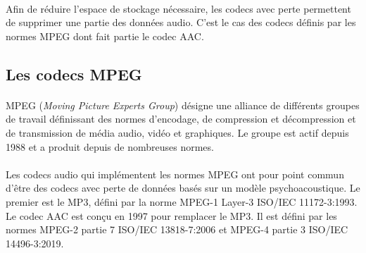 \documentclass{article}
\begin{document}
    \paragraph{}
    Afin de réduire l'espace de stockage nécessaire, les codecs avec perte permettent de supprimer une partie des données audio. C'est le cas des codecs définis par les normes MPEG dont fait partie le codec AAC.

    \subsection{Les codecs MPEG}
    \paragraph{}
    MPEG (\emph{Moving Picture Experts Group}) désigne une alliance de différents groupes de travail définissant des normes d'encodage, de compression et décompression et de transmission de média audio, vidéo et graphiques\cite{wiki:MPEG}. Le groupe est actif depuis 1988 et a produit depuis de nombreuses normes.

    \paragraph{}
    Les codecs audio qui implémentent les normes MPEG ont pour point commun d'être des codecs avec perte de données basés sur un modèle psychoacoustique. Le premier est le MP3, défini par la norme MPEG-1 Layer-3 ISO/IEC 11172-3:1993. Le codec AAC est conçu en 1997 pour remplacer le MP3. Il est défini par les normes MPEG-2 partie 7 ISO/IEC 13818-7:2006\cite{ISO13818-7} et MPEG-4 partie 3 ISO/IEC 14496-3:2019\cite{ISO14496-3}.
\end{document}
